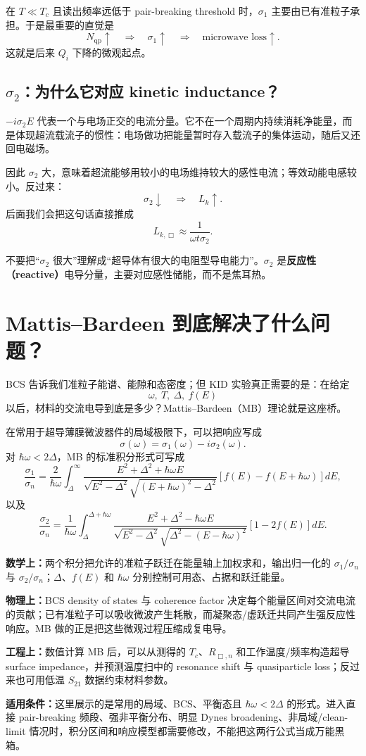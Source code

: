\documentclass[11pt,a4paper,openany]{ctexrep}
\newcommand{\formulaexplain}[4]{%
\begin{formulaguidebox}
\textbf{\color{KidBlue}数学上：}#1\par
\textbf{\color{KidTeal}物理上：}#2\par
\textbf{\color{KidGold!55!black}工程上：}#3\par
\textbf{\color{KidRed}适用条件：}#4
\end{formulaguidebox}%
}
\newcommand{\qp}{\mathrm{qp}}
\begin{document}
在 $T\ll T_c$ 且读出频率远低于 pair-breaking threshold 时，$\sigma_1$ 主要由已有准粒子承担。于是最重要的直觉是
\[
\boxed{
N_{\qp}\uparrow\quad\Longrightarrow\quad\sigma_1\uparrow\quad\Longrightarrow\quad\text{microwave loss}\uparrow.
}
\]
这就是后来 $Q_i$ 下降的微观起点。

\subsection{$\sigma_2$：为什么它对应 kinetic inductance？}

$-i\sigma_2E$ 代表一个与电场正交的电流分量。它不在一个周期内持续消耗净能量，而是体现超流载流子的惯性：电场做功把能量暂时存入载流子的集体运动，随后又还回电磁场。

因此 $\sigma_2$ 大，意味着超流能够用较小的电场维持较大的感性电流；等效动能电感较小。反过来：
\[
\boxed{
\sigma_2\downarrow
\quad\Longrightarrow\quad
L_k\uparrow.
}
\]
后面我们会把这句话直接推成
\[
L_{k,\Box}\approx\frac{1}{\omega t\sigma_2}.
\]

\begin{mistakebox}
不要把“$\sigma_2$ 很大”理解成“超导体有很大的电阻型导电能力”。$\sigma_2$ 是\textbf{反应性（reactive）}电导分量，主要对应感性储能，而不是焦耳热。
\end{mistakebox}

\section{Mattis--Bardeen 到底解决了什么问题？}

BCS 告诉我们准粒子能谱、能隙和态密度；但 KID 实验真正需要的是：在给定
\[
\omega,\ T,\ \Delta,\ f(E)
\]
以后，材料的交流电导到底是多少？Mattis--Bardeen（MB）理论就是这座桥。

在常用于超导薄膜微波器件的局域极限下，可以把响应写成
\[
\boxed{
\sigma(\omega)=\sigma_1(\omega)-i\sigma_2(\omega).
}
\]
对 $\hbar\omega<2\Delta$，MB 的标准积分形式可写成
\[
\frac{\sigma_1}{\sigma_n}
=
\frac{2}{\hbar\omega}
\int_{\Delta}^{\infty}
\frac{E^2+\Delta^2+\hbar\omega E}
{\sqrt{E^2-\Delta^2}\sqrt{(E+\hbar\omega)^2-\Delta^2}}
\left[f(E)-f(E+\hbar\omega)\right]dE,
\]
以及
\[
\frac{\sigma_2}{\sigma_n}
=
\frac{1}{\hbar\omega}
\int_{\Delta}^{\Delta+\hbar\omega}
\frac{E^2+\Delta^2-\hbar\omega E}
{\sqrt{E^2-\Delta^2}\sqrt{\Delta^2-(E-\hbar\omega)^2}}
\left[1-2f(E)\right]dE.
\]
\formulaexplain
{两个积分把允许的准粒子跃迁在能量轴上加权求和，输出归一化的 $\sigma_1/\sigma_n$ 与 $\sigma_2/\sigma_n$；$\Delta$、$f(E)$ 和 $\hbar\omega$ 分别控制可用态、占据和跃迁能量。}
{BCS density of states 与 coherence factor 决定每个能量区间对交流电流的贡献；已有准粒子可以吸收微波产生耗散，而凝聚态/虚跃迁共同产生强反应性响应。MB 做的正是把这些微观过程压缩成复电导。}
{数值计算 MB 后，可以从测得的 $T_c$、$R_{\Box,n}$ 和工作温度/频率构造超导 surface impedance，并预测温度扫中的 resonance shift 与 quasiparticle loss；反过来也可用低温 $S_{21}$ 数据约束材料参数。}
{这里展示的是常用的局域、BCS、平衡态且 $\hbar\omega<2\Delta$ 的形式。进入直接 pair-breaking 频段、强非平衡分布、明显 Dynes broadening、非局域/clean-limit 情况时，积分区间和响应模型都需要修改，不能把这两行公式当成万能黑箱。}
\end{document}
